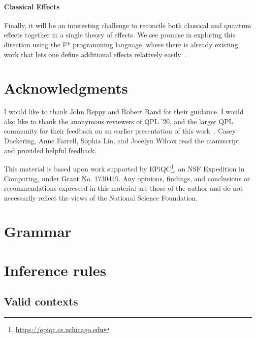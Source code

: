 \documentclass[adraft,creativecommons]{eptcs}
\theoremstyle{definition}
\theoremstyle{remark}
\begin{document}
\paragraph{Classical Effects} Finally, it will be an interesting challenge to reconcile both classical and quantum effects together in a single theory of effects. We see promise in exploring this direction using the F* programming language, where there is already existing work that lets one define additional effects relatively easily~\parencite{dm4free2017}.

\section*{Acknowledgments}
I would like to thank John Reppy and Robert Rand for their guidance. I would also like to thank the anonymous reviewers of QPL '20, and the larger QPL community for their feedback on an earlier presentation of this work~\parencite{qhtt20}. Casey Duckering, Anne Farrell, Sophia Lin, and Jocelyn Wilcox read the manuscript and provided helpful feedback.

This material is based upon work supported by EPiQC\footnote{\url{https://epiqc.cs.uchicago.edu}}, an NSF Expedition in Computing, under Grant No. 1730449. Any opinions, findings, and conclusions or recommendations expressed in this material are those
of the author and do not necessarily reflect the views of the National Science Foundation.

\printbibliography[heading=bibintoc]

\appendix

\section{Grammar}
\label{app:grammar}


\section{Inference rules}
\label{app:rules}

\subsection{Valid contexts}

\end{document}

